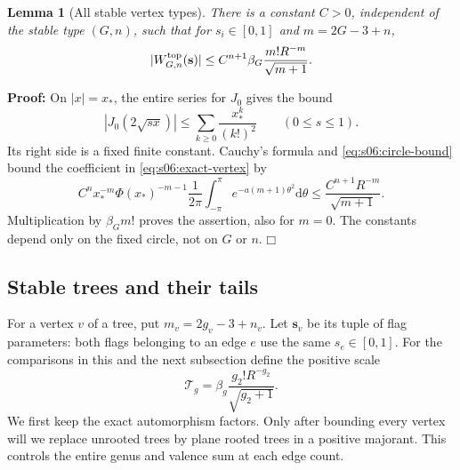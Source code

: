 \documentclass[a4paper,10pt]{article}
\numberwithin{equation}{section}
\newcommand{\dd}{\mathrm{d}}
\theoremstyle{paperplain}
\newtheorem{lmm}[thm]{Lemma}
\theoremstyle{paperremark}
\theoremstyle{paperplain}
\newenvironment{prf}{\noindent \textbf{Proof: }}{\hfill $\mdlgwhtsquare$\par\addvspace{0.5\baselineskip}}
\begin{document}
\begin{lmm}[All stable vertex types]\label{lmm:s06:vertex-bound}
There is a constant $C>0$, independent of the stable type $(G,n)$,
such that for $s_i\in[0,1]$ and $m=2G-3+n$,
\begin{equation}\label{eq:s06:vertex-bound}
 |W^{\rm top}_{G,n}(\mathbf s)|
 \leq C^{n+1}\beta_G\frac{m!R^{-m}}{\sqrt{m+1}}.
\end{equation}
\end{lmm}
\begin{prf}
On $|x|=x_*$, the entire series for $J_0$ gives the bound
\[
 |J_0(2\sqrt{s x})|
 \leq\sum_{k\geq0}\frac{x_*^k}{(k!)^2}
 \qquad(0\leq s\leq1).
\]
Its right side is a fixed finite constant. Cauchy's formula and
\eqref{eq:s06:circle-bound} bound the coefficient in
\eqref{eq:s06:exact-vertex} by
\[
 C^n x_*^{-m}\Phi(x_*)^{-m-1}
 \frac1{2\pi}\int_{-\pi}^{\pi}e^{-a(m+1)\theta^2}\dd\theta
 \leq\frac{C^{n+1}R^{-m}}{\sqrt{m+1}}.
\]
Multiplication by $\beta_Gm!$ proves the assertion, also for $m=0$.
The constants depend only on the fixed circle, not on $G$ or $n$.
\end{prf}

\subsection{Stable trees and their tails}
\label{subsec:s06:03}

For a vertex $v$ of a tree, put $m_v=2g_v-3+n_v$. Let
$\mathbf s_v$ be its tuple of flag parameters: both flags belonging
to an edge $e$ use the same $s_e\in[0,1]$.
For the comparisons in this and the next subsection define the
positive scale
\begin{equation}\label{eq:s06:tree-scale}
 \mathcal T_g=\beta_g\frac{g_2!R^{-g_2}}{\sqrt{g_2+1}}.
\end{equation}
We first keep the exact automorphism factors. Only after bounding
every vertex will we replace unrooted trees by plane rooted trees
in a positive majorant. This controls the entire genus and valence
sum at each edge count.
\end{document}
